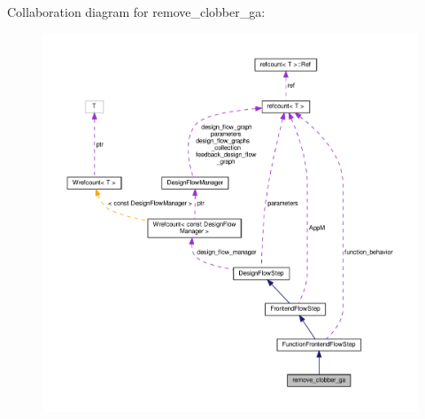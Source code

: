 Collaboration diagram for remove\+\_\+clobber\+\_\+ga\+:
\nopagebreak
\begin{figure}[H]
\begin{center}
\leavevmode
\includegraphics[width=350pt]{d1/dea/classremove__clobber__ga__coll__graph}
\end{center}
\end{figure}
